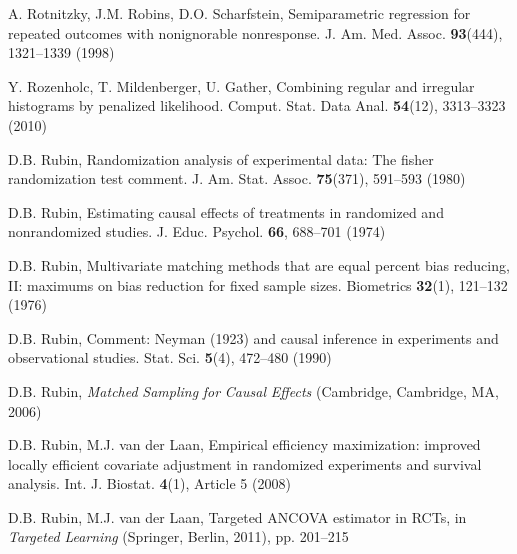 \begin{list}{}{\setlength{\leftmargin}{2.1em}\setlength{\labelwidth}{0pt}
  \setlength{\labelsep}{0pt}\setlength{\itemindent}{-2.1em}
  \setlength{\parsep}{0pt}\setlength{\itemsep}{2pt}\setlength{\topsep}{0pt}}
\item\label{refentry:REF335}A. Rotnitzky, J.M. Robins, D.O. Scharfstein, Semiparametric regression for repeated outcomes with nonignorable nonresponse. J. Am. Med. Assoc. \textbf{93}(444), 1321--1339 (1998)\label{refend:REF335}
\item\label{refentry:REF336}Y. Rozenholc, T. Mildenberger, U. Gather, Combining regular and irregular histograms by penalized likelihood. Comput. Stat. Data Anal. \textbf{54}(12), 3313--3323 (2010)\label{refend:REF336}
\item\label{refentry:REF337}D.B. Rubin, Randomization analysis of experimental data: The fisher randomization test comment. J. Am. Stat. Assoc. \textbf{75}(371), 591--593 (1980)\label{refend:REF337}
\item\label{refentry:REF338}D.B. Rubin, Estimating causal effects of treatments in randomized and nonrandomized studies. J. Educ. Psychol. \textbf{66}, 688--701 (1974)\label{refend:REF338}
\item\label{refentry:REF339}D.B. Rubin, Multivariate matching methods that are equal percent bias reducing, II: maximums on bias reduction for fixed sample sizes. Biometrics \textbf{32}(1), 121--132 (1976)\label{refend:REF339}
\item\label{refentry:REF340}D.B. Rubin, Comment: Neyman (1923) and causal inference in experiments and observational studies. Stat. Sci. \textbf{5}(4), 472--480 (1990)\label{refend:REF340}
\item\label{refentry:REF341}D.B. Rubin, \textit{Matched} \textit{Sampling} \textit{for} \textit{Causal} \textit{Effects} (Cambridge, Cambridge, MA, 2006)\label{refend:REF341}
\item\label{refentry:REF342}D.B. Rubin, M.J. van der Laan, Empirical efficiency maximization: improved locally efficient covariate adjustment in randomized experiments and survival analysis. Int. J. Biostat. \textbf{4}(1), Article 5 (2008)\label{refend:REF342}
\item\label{refentry:REF343}D.B. Rubin, M.J. van der Laan, Targeted ANCOVA estimator in RCTs, in \textit{Targeted} \textit{Learning} (Springer, Berlin, 2011), pp. 201--215\label{refend:REF343}

\end{list}

